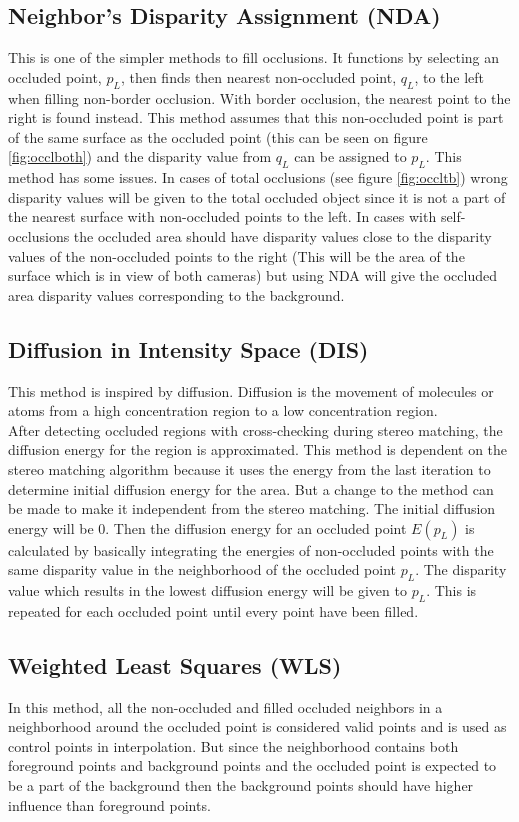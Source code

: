 \subsection{Neighbor's Disparity Assignment (NDA)}\label{sec:nda}
This is one of the simpler methods to fill occlusions. It functions by selecting an occluded point, $p_L$, then finds then nearest non-occluded point, $q_L$, to the left when filling non-border occlusion. With border occlusion, the nearest point to the right is found instead. This method assumes that this non-occluded point is part of the same surface as the occluded point (this can be seen on figure \ref{fig:occlboth}) and the disparity value from $q_L$ can be assigned to $p_L$. This method has some issues. In cases of total occlusions (see figure \ref{fig:occltb}) wrong disparity values will be given to the total occluded object since it is not a part of the nearest surface with non-occluded points to the left. In cases with self-occlusions the occluded area should have disparity values close to the disparity values of the non-occluded points to the right (This will be the area of the surface which is in view of both cameras) but using NDA will give the occluded area disparity values corresponding to the background.

\subsection{Diffusion in Intensity Space (DIS)}
This method is inspired by diffusion. Diffusion is the movement of molecules or atoms from a high concentration region to a low concentration region. \\

After detecting occluded regions with cross-checking during stereo matching, the diffusion energy for the region is approximated. This method is dependent on the stereo matching algorithm because it uses the energy from the last iteration to determine initial diffusion energy for the area. But a change to the method can be made to make it independent from the stereo matching. The initial diffusion energy will be 0. Then the diffusion energy for an occluded point  $E(p_L)$ is calculated by basically integrating the energies of non-occluded points with the same disparity value in the neighborhood of the occluded point $p_L$. The disparity value which results in the lowest diffusion energy will be given to $p_L$. This is repeated for each occluded point until every point have been filled.

\subsection{Weighted Least Squares (WLS)}
In this method, all the non-occluded and filled occluded neighbors in a neighborhood around the occluded point is considered valid points and is used as control points in interpolation. But since the neighborhood contains both foreground points and background points and the occluded point is expected to be a part of the background then the background points should have higher influence than foreground points. \\

